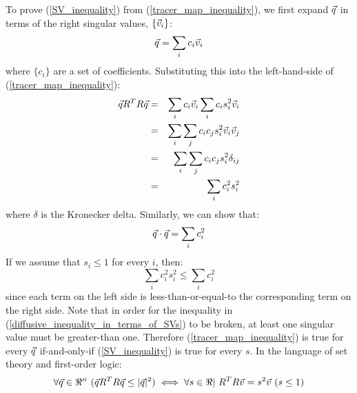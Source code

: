 \documentclass{article}
\begin{document}
To prove (\ref{SV_inequality}) from (\ref{tracer_map_inequality}), we first
expand $\vec q$ in terms of the right singular values, 
$\lbrace \vec v_i \rbrace$:
\begin{equation}
	\vec q = \sum_i c_i \vec v_i
\end{equation}
where $\lbrace c_i \rbrace$ are a set of coefficients.
Substituting this into the left-hand-side of (\ref{tracer_map_inequality}):
\begin{eqnarray}
	\vec q R^T R \vec q & = & \sum_i c_i \vec v_i \sum_i c_i s_i^2 \vec v_i \\
   & = & \sum_i \sum_j c_i c_j s_i^2 \vec v_i \vec v_j \\
   & = & \sum_i \sum_j c_i c_j s_i^2 \delta_{ij} \\
	  & = & \sum_i c_i^2 s_i^2
\end{eqnarray}
where $\delta$ is the Kronecker delta.
Similarly, we can show that:
\begin{equation}
	\vec q \cdot \vec q = \sum_i c_i^2
\end{equation}
If we assume that $s_i \le 1$ for every $i$, then:
\begin{equation}
	\sum_i c_i^2 s_i^2 \le \sum_i c_i^2 
	\label{diffusive_inequality_in_terms_of_SVs}
\end{equation}
since each term on the left side is less-than-or-equal-to the
corresponding term on the right side. 
Note that in order for the inequality in 
(\ref{diffusive_inequality_in_terms_of_SVs}) to be broken, at least one
singular value must be greater-than one.
Therefore (\ref{tracer_map_inequality}) is true for every $\vec q$
if-and-only-if (\ref{SV_inequality}) is true for every $s$.
In the language of set theory and first-order logic:
\begin{equation}
	\forall \vec q \in \Re^n ~ (\vec q R^T R \vec q \le |\vec q |^2) \iff \forall s \in \Re | ~R^T R \vec v = s^2 \vec v ~ (s \le 1)
\end{equation}
\end{document}
